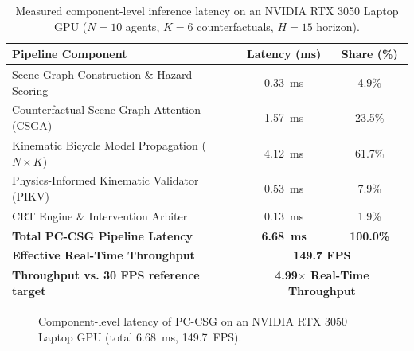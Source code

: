 \begin{table}[H]
\caption{Measured component-level inference latency on an NVIDIA RTX 3050 Laptop GPU ($N=10$ agents, $K=6$ counterfactuals, $H=15$ horizon).}
\centering
\label{table_latency}
\begin{tabular}{l|c|c}
\hline
\textbf{Pipeline Component} & \textbf{Latency (ms)} & \textbf{Share (\%)} \\
\hline
Scene Graph Construction \& Hazard Scoring & 0.33~ms & 4.9\% \\
Counterfactual Scene Graph Attention (CSGA) & 1.57~ms & 23.5\% \\
Kinematic Bicycle Model Propagation ($N \times K$) & 4.12~ms & 61.7\% \\
Physics-Informed Kinematic Validator (PIKV) & 0.53~ms & 7.9\% \\
CRT Engine \& Intervention Arbiter & 0.13~ms & 1.9\% \\
\hline
\textbf{Total PC-CSG Pipeline Latency} & \textbf{6.68~ms} & \textbf{100.0\%} \\
\textbf{Effective Real-Time Throughput} & \multicolumn{2}{c}{\textbf{149.7 FPS}} \\
\textbf{Throughput vs. 30 FPS reference target} & \multicolumn{2}{c}{\textbf{4.99$\times$ Real-Time Throughput}} \\
\hline
\end{tabular}
\end{table}

\begin{figure}[H]
\centering
{}
\captionsetup{singlelinecheck = false, format= hang, justification=justified, font=footnotesize, labelsep=space}
\caption{Component-level latency of PC-CSG on an NVIDIA RTX 3050 Laptop GPU (total 6.68~ms, 149.7~FPS).}
\label{fig_latency}
\end{figure}

